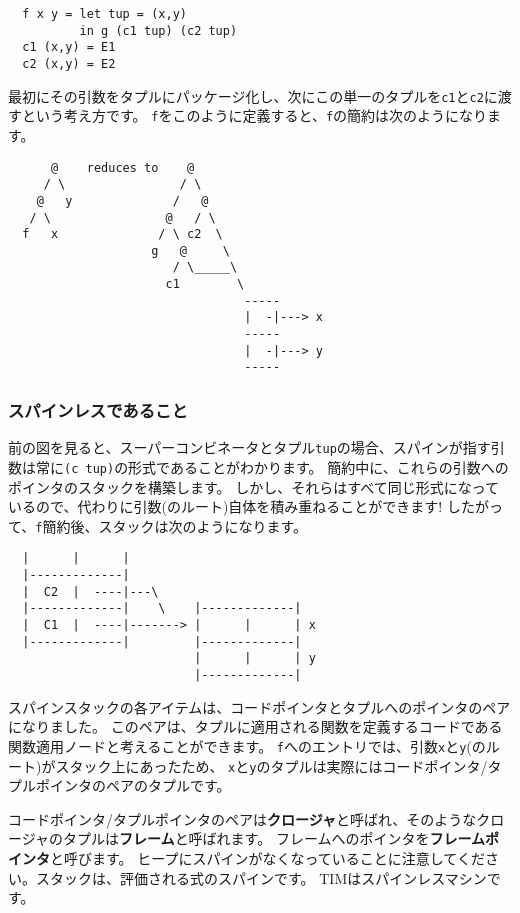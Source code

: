 \documentclass{jarticle}
\begin{document}
\begin{verbatim}
  f x y = let tup = (x,y)
          in g (c1 tup) (c2 tup)
  c1 (x,y) = E1
  c2 (x,y) = E2
\end{verbatim}

最初にその引数をタプルにパッケージ化し、次にこの単一のタプルを\texttt{c1}と\texttt{c2}に渡すという考え方です。
\texttt{f}をこのように定義すると、\texttt{f}の簡約は次のようになります。

\begin{verbatim}
      @    reduces to    @
     / \                / \
    @   y              /   @
   / \                @   / \
  f   x              / \ c2  \
                    g   @     \
                       / \_____\
                      c1        \
                                 -----
                                 |  -|---> x
                                 -----
                                 |  -|---> y
                                 -----
\end{verbatim}

\subsubsection{スパインレスであること}

前の図を見ると、スーパーコンビネータとタプル\texttt{tup}の場合、スパインが指す引数は常に\texttt{(c tup)}の形式であることがわかります。
簡約中に、これらの引数へのポインタのスタックを構築します。
しかし、それらはすべて同じ形式になっているので、代わりに引数(のルート)自体を積み重ねることができます!
したがって、\texttt{f}簡約後、スタックは次のようになります。

\begin{verbatim}
  |      |      |
  |-------------|
  |  C2  |  ----|---\
  |-------------|    \    |-------------|
  |  C1  |  ----|-------> |      |      | x
  |-------------|         |-------------|
                          |      |      | y
                          |-------------|
\end{verbatim}

スパインスタックの各アイテムは、コードポインタとタプルへのポインタのペアになりました。
このペアは、タプルに適用される関数を定義するコードである関数適用ノードと考えることができます。
\texttt{f}へのエントリでは、引数\texttt{x}と\texttt{y}(のルート)がスタック上にあったため、
\texttt{x}と\texttt{y}のタプルは実際にはコードポインタ/タプルポインタのペアのタプルです。

コードポインタ/タプルポインタのペアは\textbf{クロージャ}と呼ばれ、そのようなクロージャのタプルは\textbf{フレーム}と呼ばれます。
フレームへのポインタを\textbf{フレームポインタ}と呼びます。
ヒープにスパインがなくなっていることに注意してください。スタックは、評価される式のスパインです。
TIMはスパインレスマシンです。
\end{document}
